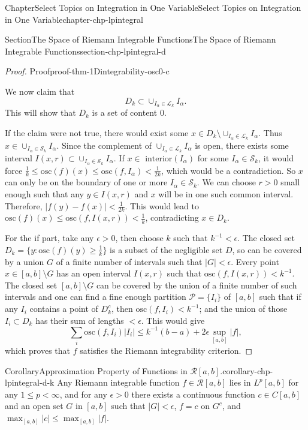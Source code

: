 \documentclass[oneside,10pt,]{book}
\numberwithin{equation}{section}
\newcommand{\cL}{\mathcal{L}}
\newcommand{\cP}{\mathcal{P}}
\newcommand{\cR}{\mathcal{R}}
\newcommand{\cS}{\mathcal{S}}
\newcommand{\osc}{\text{osc}}
\begin{document}
\begin{chapterptx}{Chapter}{Select Topics on Integration in One Variable}{}{Select Topics on Integration in One Variable}{}{}{chapter-chp-lpintegral}
\begin{sectionptx}{Section}{The Space of Riemann Integrable Functions}{}{The Space of Riemann Integrable Functions}{}{}{section-chp-lpintegral-d}
\begin{proof}{Proof}{}{proof-thm-1Dintegrability-osc0-c}
\begin{equation*}
\end{equation*}
%
\par
We now claim that%
\begin{equation*}
D_{k}\subset \cup_{I_{\alpha}\in \cL_{k} } I_{\alpha}.
\end{equation*}
This will show that \(D_{k}\) is a set of content \(0\).%
\par
If the claim were not true, there would exist some \(x \in D_{k}
\setminus \cup_{I_{\alpha}\in \cL_{k} } I_{\alpha}\). Thus \(x \in \cup_{I_{\alpha}\in \cS_{k} } I_{\alpha}\). Since the complement of \(\cup_{I_{\alpha}\in \cL_{k} } I_{\alpha}\) is open, there exists some interval \(I(x, r)
\subset \cup_{I_{\alpha}\in \cS_{k} } I_{\alpha}\). If \(x\in \text{ interior}(I_{\alpha})\) for some \(I_{\alpha} \in \cS_{k}\), it would force \(\frac 1k \le \osc(f)(x)\le \osc(f, I_{\alpha}) < \frac{1}{2k}\), which would be a contradiction. So \(x\) can only be on the boundary of one or more \(I_{\alpha} \in \cS_{k}\). We can choose \(r>0\) small enough such that any \(y\in I(x, r)\) and \(x\) will be in one such common interval. Therefore, \(\vert f(y)-f(x)\vert < \frac{1}{2k}\). This would lead to \(\osc(f)(x)\le \osc(f, I(x, r)) < \frac 1k\), contradicting \(x \in D_{k}\).%
\par
For the if part, take any \(\epsilon > 0\), then choose \(k\) such that \(k^{-1} < \epsilon\). The closed set \(D_{k}=\{y: \osc(f)(y)\ge \frac 1k\}\) is a subset of the negligible set \(D\), so can be covered by a union \(G\) of a finite number of intervals such that \(|G| < \epsilon\). Every point \(x\in [a, b]\setminus G\) has an open interval \(I(x, r)\) such that \(\osc(f, I(x, r)) < k^{-1}\). The closed set \([a, b]\setminus G\) can be covered by the union of a finite number of such intervals and one can find a fine enough partition \(\cP=\{I_{i}\}\) of \([a, b]\) such that if any \(I_{i}\) contains a point of \(D_{k}^{c}\), then \(\osc(f, I_{i})< k^{-1}\); and the union of those \(I_{i}\subset D_{k} \) has their sum of lengths \(< \epsilon\). This would give%
\begin{equation*}
\sum_{i} \osc(f, I_{i})|I_{i}| \le k^{-1}(b-a) + 2\epsilon \sup_{[a, b]}|f| ,
\end{equation*}
which proves that \(f\)  satisfies the Riemann integrability criterion.%
\end{proof}
\begin{corollary}{Corollary}{Approximation Property of Functions in \(\cR[a, b]\).}{}{corollary-chp-lpintegral-d-k}%
Any Riemann integrable function \(f\in \cR[a, b]\) lies in \(L^{p}[a, b]\) for any \(1\le p < \infty\), and for any \(\epsilon > 0\) there exists a continuous function \(c\in C[a, b]\) and an open set \(G\) in \([a, b]\) such that \(|G| < \epsilon\), \(f=c\) on \(G^{c}\), and \(\max_{[a, b]}|c| \le \max_{[a,b]}|f|\).\end{corollary}

\end{sectionptx}
\end{chapterptx}
\end{document}
